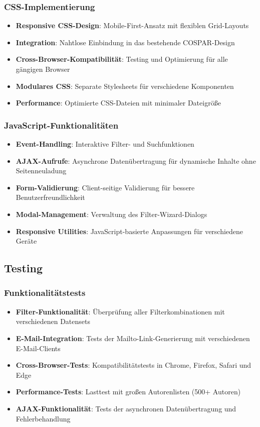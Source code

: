 \documentclass[11pt,a4paper]{article}
\begin{document}
\subsubsection{CSS-Implementierung}
\begin{itemize}
    \item \textbf{Responsive CSS-Design}: Mobile-First-Ansatz mit flexiblen Grid-Layouts
    \item \textbf{Integration}: Nahtlose Einbindung in das bestehende COSPAR-Design
    \item \textbf{Cross-Browser-Kompatibilität}: Testing und Optimierung für alle gängigen Browser
    \item \textbf{Modulares CSS}: Separate Stylesheets für verschiedene Komponenten
    \item \textbf{Performance}: Optimierte CSS-Dateien mit minimaler Dateigröße
\end{itemize}

\subsubsection{JavaScript-Funktionalitäten}
\begin{itemize}
    \item \textbf{Event-Handling}: Interaktive Filter- und Suchfunktionen
    \item \textbf{AJAX-Aufrufe}: Asynchrone Datenübertragung für dynamische Inhalte ohne Seitenneuladung
    \item \textbf{Form-Validierung}: Client-seitige Validierung für bessere Benutzerfreundlichkeit
    \item \textbf{Modal-Management}: Verwaltung des Filter-Wizard-Dialogs
    \item \textbf{Responsive Utilities}: JavaScript-basierte Anpassungen für verschiedene Geräte
\end{itemize}

\subsection{Testing}

\subsubsection{Funktionalitätstests}
\begin{itemize}
    \item \textbf{Filter-Funktionalität}: Überprüfung aller Filterkombinationen mit verschiedenen Datensets
    \item \textbf{E-Mail-Integration}: Tests der Mailto-Link-Generierung mit verschiedenen E-Mail-Clients
    \item \textbf{Cross-Browser-Tests}: Kompatibilitätstests in Chrome, Firefox, Safari und Edge
    \item \textbf{Performance-Tests}: Lasttest mit großen Autorenlisten (500+ Autoren)
    \item \textbf{AJAX-Funktionalität}: Tests der asynchronen Datenübertragung und Fehlerbehandlung
\end{itemize}
\end{document}
